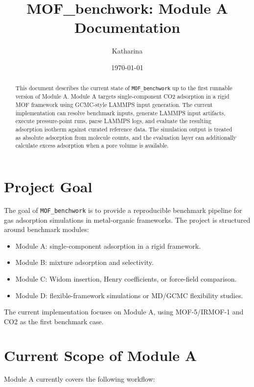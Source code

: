\documentclass[11pt,a4paper]{article}
\title{MOF\_benchwork: Module A Documentation}
\author{Katharina}
\date{\today}
\begin{document}
\maketitle

\begin{abstract}
This document describes the current state of \texttt{MOF\_benchwork} up to the first runnable version of Module A.
Module A targets single-component CO2 adsorption in a rigid MOF framework using GCMC-style LAMMPS input generation.
The current implementation can resolve benchmark inputs, generate LAMMPS input artifacts, execute pressure-point runs, parse LAMMPS logs, and evaluate the resulting adsorption isotherm against curated reference data.
The simulation output is treated as absolute adsorption from molecule counts, and the evaluation layer can additionally calculate excess adsorption when a pore volume is available.
\end{abstract}

\tableofcontents
\newpage

\section{Project Goal}

The goal of \texttt{MOF\_benchwork} is to provide a reproducible benchmark pipeline for gas adsorption simulations in metal-organic frameworks.
The project is structured around benchmark modules:

\begin{itemize}
    \item Module A: single-component adsorption in a rigid framework.
    \item Module B: mixture adsorption and selectivity.
    \item Module C: Widom insertion, Henry coefficients, or force-field comparison.
    \item Module D: flexible-framework simulations or MD/GCMC flexibility studies.
\end{itemize}

The current implementation focuses on Module A, using MOF-5/IRMOF-1 and CO2 as the first benchmark case.

\section{Current Scope of Module A}

Module A currently covers the following workflow:
\end{document}
